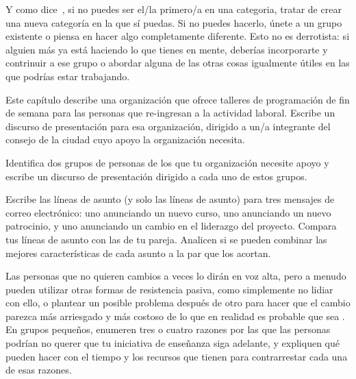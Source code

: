 Y como dice~\cite{Kuch2011},
si no puedes ser el/la primero/a en una categoria,
tratar de crear una nueva categoría en la que sí puedas.
Si no puedes hacerlo,
únete a un grupo existente o piensa en hacer algo completamente diferente.
Esto no es derrotista:
si alguien más ya está haciendo lo que tienes en mente,
deberías incorporarte y contrinuir a ese grupo o 
abordar alguna de las otras cosas igualmente útiles
en las que podrías estar trabajando.



Este capítulo describe una organización
que ofrece talleres de programación de fin de semana para las personas que re-ingresan a la actividad laboral.
Escribe un discurso de presentación para esa organización,
dirigido a un/a integrante del consejo de la ciudad cuyo apoyo la organización necesita.


Identifica dos grupos de personas de los que tu organización necesite apoyo
y escribe un discurso de presentación dirigido a cada uno de estos grupos.


Escribe las líneas de asunto (y solo las líneas de asunto) para tres mensajes de correo electrónico:
uno anunciando un nuevo curso,
uno anunciando un nuevo patrocinio,
y uno anunciando un cambio en el liderazgo del proyecto.
Compara tus líneas de asunto con las de tu pareja.
Analicen  si se pueden combinar las mejores características de cada asunto a la par que los acortan.


Las personas que no quieren cambios a veces lo dirán en voz alta,
pero a menudo pueden utilizar otras formas de resistencia pasiva,
como simplemente no lidiar con ello,
o plantear un posible problema después de otro 
para hacer que el cambio parezca más arriesgado 
y más costoso de lo que en realidad es probable que sea
\cite {Scot1987}.
En grupos pequeños,
enumeren tres o cuatro razones por las que las personas podrían no querer 
que tu iniciativa de enseñanza siga adelante,
y expliquen qué pueden hacer con el tiempo y los recursos que tienen 
para contrarrestar cada una de esas razones.


